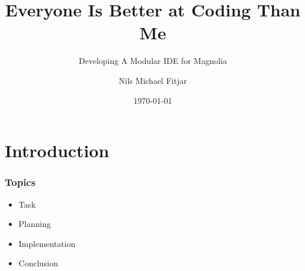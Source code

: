 \documentclass{beamer}
\title{Everyone Is Better at Coding Than Me}
\subtitle{Developing A Modular IDE for Magnolia}
\author{Nils Michael Fitjar}
\institute{University of Bergen}
\date{\today}
\begin{document}
\section{Introduction}

\begin{frame}
    \frametitle{Topics}
    \begin{itemize}
      \item Task
      \item Planning
      \item Implementation
      \item Conclusion
    \end{itemize}
\end{frame}




\end{document}
